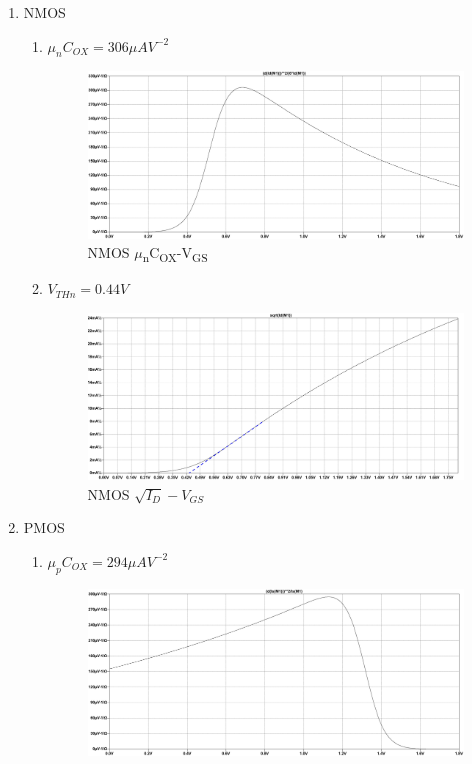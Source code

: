 \documentclass{article}
\begin{document}
\begin{enumerate}
\begin{enumerate}
\item NMOS
\begin{enumerate}
\item \(\mu_{n}C_{OX} = 306 \mu{}AV^{-2}\)
\begin{figure}[H]
\centering
\includegraphics[width=.9\linewidth]{img/q3/b/nmos-ucox-vgs.pdf}
\caption{\label{fig:nmos-ucox-vgs}NMOS \(\mu\)\textsubscript{n}C\textsubscript{OX}-V\textsubscript{GS}}
\end{figure}
\item \(V_{THn} = 0.44V\)
\begin{figure}[H]
\centering
\includegraphics[width=.9\linewidth]{img/q3/b/nmos-sqrt-id-vgs.pdf}
\caption{\label{fig:nmos-sqrt-id-vgs}NMOS \(\sqrt{I_{D}}-V_{GS}\)}
\end{figure}
\end{enumerate}
\item PMOS
\begin{enumerate}
\item \(\mu_{p}C_{OX} = 294 \mu{}AV^{-2}\)
\begin{figure}[H]
\centering
\includegraphics[width=.9\linewidth]{img/q3/b/pmos-ucox-vgd.pdf}

\end{figure}
\end{enumerate}
\end{enumerate}
\end{enumerate}
\end{document}
